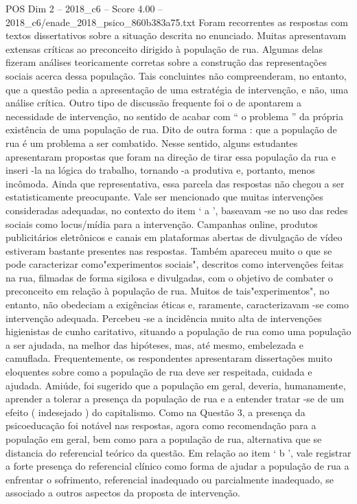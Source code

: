 \begin{textsample}{POS Dim 2 – 2018\_c6 – Score 4.00 – 2018\_c6/enade\_2018\_psico\_860b383a75.txt}
Foram recorrentes as respostas com textos dissertativos sobre a situação descrita no enunciado.
Muitas apresentavam extensas críticas ao preconceito dirigido à população de rua.
Algumas delas fizeram análises teoricamente corretas sobre a construção das representações sociais acerca dessa população.
Tais concluintes não compreenderam, no entanto, que a questão pedia a apresentação de uma estratégia de intervenção, e não, uma análise crítica.
Outro tipo de discussão frequente foi o de apontarem a necessidade de intervenção, no sentido de acabar com “ o problema ” da própria existência de uma população de rua.
Dito de outra forma : que a população de rua é um problema a ser combatido.
Nesse sentido, alguns estudantes apresentaram propostas que foram na direção de tirar essa população da rua e inseri -la na lógica do trabalho, tornando -a produtiva e, portanto, menos incômoda.
Ainda que representativa, essa parcela das respostas não chegou a ser estatisticamente preocupante.
Vale ser mencionado que muitas intervenções consideradas adequadas, no contexto do item ‘ a ’, baseavam -se no uso das redes sociais como locus/mídia para a intervenção.
Campanhas online, produtos publicitários eletrônicos e canais em plataformas abertas de divulgação de vídeo estiveram bastante presentes nas respostas.
Também apareceu muito o que se pode caracterizar como"experimentos sociais", descritos como intervenções feitas na rua, filmadas de forma sigilosa e divulgadas, com o objetivo de combater o preconceito em relação à população de rua.
Muitos de tais"experimentos", no entanto, não obedeciam a exigências éticas e, raramente, caracterizavam -se como intervenção adequada.
Percebeu -se a incidência muito alta de intervenções higienistas de cunho caritativo, situando a população de rua como uma população a ser ajudada, na melhor das hipóteses, mas, até mesmo, embelezada e camuflada.
Frequentemente, os respondentes apresentaram dissertações muito eloquentes sobre como a população de rua deve ser respeitada, cuidada e ajudada.
Amiúde, foi sugerido que a população em geral, deveria, humanamente, aprender a tolerar a presença da população de rua e a entender tratar -se de um efeito ( indesejado ) do capitalismo.
Como na Questão 3, a presença da psicoeducação foi notável nas respostas, agora como recomendação para a população em geral, bem como para a população de rua, alternativa que se distancia do referencial teórico da questão.
Em relação ao item ‘ b ’, vale registrar a forte presença do referencial clínico como forma de ajudar a população de rua a enfrentar o sofrimento, referencial inadequado ou parcialmente inadequado, se associado a outros aspectos da proposta de intervenção.

\end{textsample}
